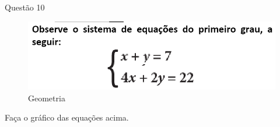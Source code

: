 \documentclass{beamer}
\begin{document}
\begin{frame}{Questão 10}
    \begin{figure}
        \caption{Geometria}
        \includegraphics[scale=0.8]{qst22.53.png}
    \end{figure}
    \begin{center}
        Faça o gráfico das equações acima.
    \end{center}
\end{frame}
\end{document}
